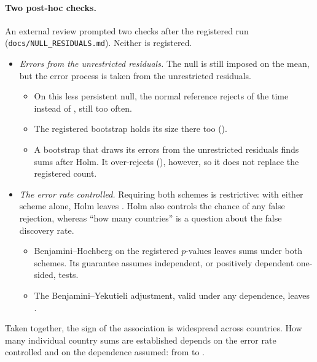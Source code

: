 \paragraph{Two post-hoc checks.} An external review prompted two checks after the
registered run (\texttt{docs/NULL\_RESIDUALS.md}). Neither is registered.
\begin{itemize}
  \item \emph{Errors from the unrestricted residuals.} The null is still imposed on the
    mean, but the error process is taken from the unrestricted residuals.
    \begin{itemize}
      \item On this less persistent null, the normal reference rejects
         of the time instead of , still too
        often.
      \item The registered bootstrap holds its size there too
        ().
      \item A bootstrap that draws its errors from the unrestricted residuals finds
         sums after Holm. It over-rejects
        (), however, so it does not replace the registered count.
    \end{itemize}
  \item \emph{The error rate controlled.} Requiring both schemes is restrictive: with
    either scheme alone, Holm leaves . Holm also controls the
    chance of any false rejection, whereas ``how many countries'' is a question about the
    false discovery rate.
    \begin{itemize}
      \item Benjamini--Hochberg on the registered $p$-values leaves  sums
        under both schemes. Its guarantee assumes independent, or positively dependent
        one-sided, tests.
      \item The Benjamini--Yekutieli adjustment, valid under any dependence, leaves
        .
    \end{itemize}
\end{itemize}
Taken together, the sign of the association is widespread across countries. How many
individual country sums are established depends on the error rate controlled and on the
dependence assumed: from  to .

